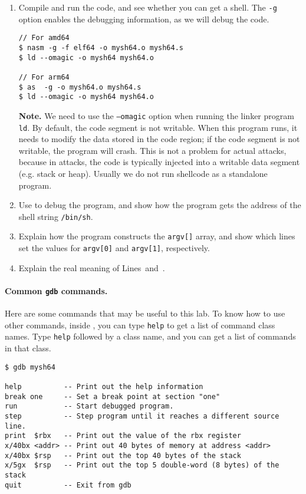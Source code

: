 \begin{enumerate}
\item Compile and run the code, and see whether you can
get a shell. The \texttt{-g} option enables the debugging 
information, as we will debug the code.  

\begin{lstlisting}
// For amd64
$ nasm -g -f elf64 -o mysh64.o mysh64.s 
$ ld --omagic -o mysh64 mysh64.o 

// For arm64
$ as  -g -o mysh64.o mysh64.s
$ ld --omagic -o mysh64 mysh64.o
\end{lstlisting}


\textbf{Note.} We need to use the \texttt{--omagic} option when running the
linker program \texttt{ld}. 
By default, the code segment is not writable.
When this program runs, it needs to modify the data stored
in the code region; if the code segment is not
writable, the program will crash.
This is not a problem for actual attacks, because
in attacks, the code is typically injected into a writable data
segment (e.g. stack or heap). Usually we do not run shellcode
as a standalone program.



\item Use \gdb to debug the program, and show how the program
gets the address of the shell string \texttt{/bin/sh}.  

\item Explain how the program constructs the 
\texttt{argv[]} array, and show which lines set the values
for \texttt{argv[0]} and \texttt{argv[1]}, respectively.   

\item Explain the real meaning of Lines~\lineone and~\linetwo. 
\end{enumerate}
 


\paragraph{Common \texttt{gdb} commands.} 
Here are some \gdb commands that may be useful to this lab. 
To know how to use other \gdb commands, 
inside \gdb, you can type \texttt{help} to get 
a list of command class names. Type \texttt{help} followed 
by a class name, and you can get a list of commands in that class.


\begin{lstlisting}
$ gdb mysh64

help          -- Print out the help information
break one     -- Set a break point at section "one"
run           -- Start debugged program.
step          -- Step program until it reaches a different source line.
print  $rbx   -- Print out the value of the rbx register
x/40bx <addr> -- Print out 40 bytes of memory at address <addr>
x/40bx $rsp   -- Print out the top 40 bytes of the stack
x/5gx  $rsp   -- Print out the top 5 double-word (8 bytes) of the stack
quit          -- Exit from gdb 
\end{lstlisting}


